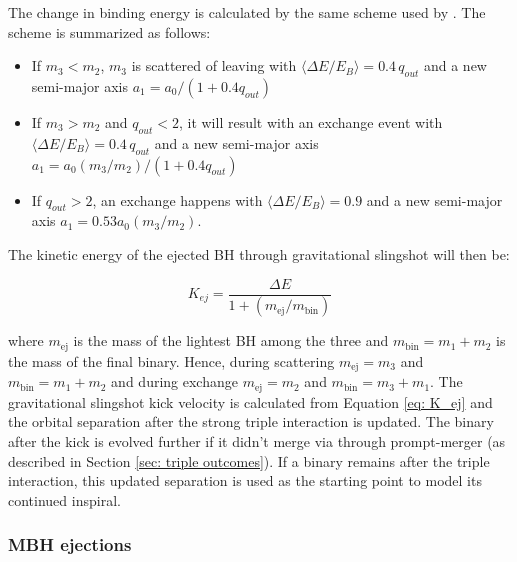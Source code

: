 \documentclass[11pt, letterpaper]{article}
\begin{document}
The change in binding energy is calculated by the same scheme used by \cite{volonteri_assembly_2003}. The scheme is summarized as follows:

\begin{itemize}
    \item If $m_3<m_2$, $m_3$ is scattered of leaving with $\langle\Delta E/ E_B\rangle = 0.4 \, q_{out}$  and a new semi-major axis $a_1 = a_0/(1+0.4 q_{out})$
    \item If $m_3 > m_2$ and $q_{out} < 2$, it will result with an exchange event with $\langle\Delta E/ E_B\rangle = 0.4 \, q_{out}$ 
    and a new semi-major axis $a_1 = a_0 (m_3/m_2)/(1+0.4 q_{out})$
    \item If $q_{out} > 2$, an exchange happens with $\langle\Delta E/ E_B\rangle = 0.9$ and a new semi-major axis $a_1 = 0.53 a_0 (m_3/m_2)$.
\end{itemize}

The kinetic energy of the ejected BH through gravitational slingshot will then be:

\begin{equation}
    K_{ej} = \frac{\Delta E}{1 + (m_{\text{ej}}/m_{\text{bin}})}
    \label{eq: K_ej}
\end{equation}

where $m_{\text{ej}}$ is the mass of the lightest BH among the three and $m_{\text{bin}} = m_1 + m_2$ is the mass of the final binary. Hence, during scattering $m_{\text{ej}} = m_{3}$ and $m_{\text{bin}} = m_1 + m_2$ and during exchange  $m_{\text{ej}} = m_{2}$ and $m_{\text{bin}} = m_3 + m_1$. The gravitational slingshot kick velocity is calculated from Equation \ref{eq: K_ej} and the orbital separation after the strong triple interaction is updated. The binary after the kick is evolved further if it didn't merge via through prompt-merger (as described in Section \ref{sec: triple outcomes}). If a binary remains after the triple interaction, this updated separation is used as the starting point to model its continued inspiral.

\subsubsection{MBH ejections}
\label{sec: BH ejections}
\end{document}
